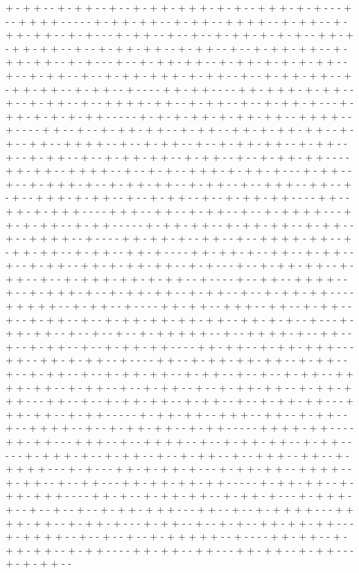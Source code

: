 + - + + - - + - + + - - + - - + - + + - + + + - + - + - - + + + - + - + - - - + - - + + + + - - - - - + - + + - + + - - + - + + - - + + + + - - + - + + - - + - + + - + + - - + - + - - - + - + + - - + - - + - - + - + + - + - + - + - - + + - + - + + - + + - - + - - + - + + - + + - - + - + + - - + - - + - + + - + + - - + - + + - + + - - + - + - - - + - - + - + + - + + - - + - + + - + - + - + - + + - - + - - + - + + - - + - - + - + + - + + + - + - + + - - + - - + - + + - + + - - + - + + - + + - - + - + + - - + - - - - + + - + + - - - - + + - + + + - + - + + - - + - - + - + + - - + - - + + + + - + + - - + - + + - - + - - + - + + - + - - - + - + + - + - + - + - + + - - - - - + - + - + - + + - + - + + - + + - - + + + + - - + - - - - + + - - + - - + - + + - + + - - + - + + - - + + - + - + + - + + - - + - + - - + + - - + + + + - - + - - + - + + - - + - - + - + + - + + - - + - + + - - + - - + - + + - - + - - + - + + - + + - - + - + + - - + - - + - + + - + + - - - - + + - + + - - + + + + - - + - - + - + - - + + + - + - + + - + - - - + - + + - - + - - + - + + + - + - - + - + + - + + - - + - + + - - + - - + + + - - + + - - + - + - - + + + - + - + + - - + - - + - + + - - + - - + - + + - + + - - - - + + - - + + - + - + + + - - - - + + + - - + + - - + - + + - - + - - + - + + + + - - - + + - + - + + - - + - + + - - - - - + - + + - + + - - + - + + - + + - - + - + + - - + - - + + + + - - + - - - - + + - + + - + - - + + - - + - - + + + + - + + - - + - + + - + + - - + - + + - - + + - + - - - - + + - + + - + - - + + - - + - + + - - + - - + - + + - - + + - + - + + - + + - - + - + - - - + - - + - + + - + + - - + - + + - - + - - + - + + + - + + - + - + + - - + - - - - + - - + + - - + + + + - - + - - + - + + + - + - - + - + + - + + - - + - + + - - + - - + - + + - + + - - - - + + + + + - - + - + + - - + - - - - + + - + + - - + + + - - + + - - + - + + - - + - - + - + + - - + - - + - + + - + + - + + - + + - - + + - + - + - - + - - - + - + + - + + - - + - - + - - + - - + - + + + + + - - + - - + + + + - + - - + + - - + - - + - + + - - + - - + - + + - + + - - - - + + - + + - - + - + + - + + + - - - + + - - + + - + - + + - - + - - - - + + - - + - + + - + + - + + - - + - + + - - + - - + - + + - - + - - + - + + - + + - - + - + + - - + - - + - - + - + + - - + + + + - + + - - + - + + - - + - - + - + + - - + - - + - + + - + + - - + - + + - + + + - - - + + - - + - - + - + + - + + - - + - + + - - + - - + - + + - + + - - - + + + - + + - - + - + + - - - - - + - + + - + + - - + + + - - + + - - + - + + - - + - - + + + + - - + - - + - + + - + + - - + - + + - - - - - + + + + - + + - - - - + + - + + - - - + + + - - + - - + + + + - - + - - + - + + - + + - - + - + + - - - - - + - + + + - + - - + - + + - - + - - + - + + - - + - - + + + - - + + - - + - + + + + - - - + - + - - - + + - + - + + - + - - - + - + + - + + - - + + + + - - + - + + - - + - - + + - - - + + - + + - + + - + + - - - - - + - + + - + + - - + - + + - + + + - - - - + + - + - - + - + + - + + - - + - + + - + - - - + - + + + - + - - + - - + - - + - - + - + + - + + + - - - + + - - + - - + - + + + + - - - + + + + - + + - - + - + + - + - - - + - + + - - + - - + - + - - + + - + + - + + - - - + - + + + + - - + - - + - - + - - + - + + + + + - - + - - - - + + - + + - - + - + + - + + - - + - + + - - - - + + - + + - - + + - - - + + - + + - - + - + + - - - + - + - + + - - 